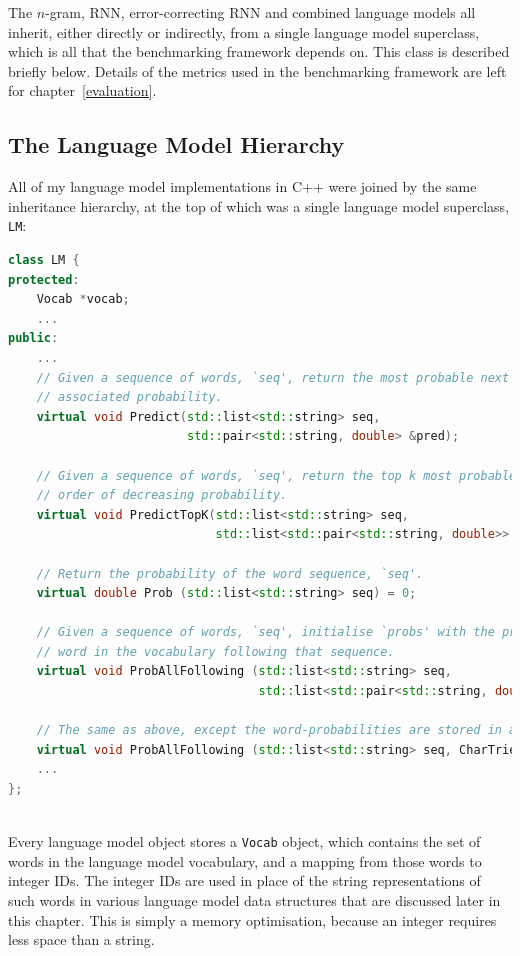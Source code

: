 \documentclass[a4paper, 12pt]{report}
\newcommand{\ttt}[1]{\texttt{#1}}
\begin{document}
The $n$-gram, RNN, error-correcting RNN and combined language models all inherit, either directly or indirectly, from a single language model superclass, which is all that the benchmarking framework depends on. This class is described briefly below. Details of the metrics used in the benchmarking framework are left for chapter~\ref{evaluation}. \\

\subsection{The Language Model Hierarchy} \label{lm_interface}

All of my language model implementations in C++ were joined by the same inheritance hierarchy, at the top of which was a single language model superclass, \ttt{LM}: \\

\begin{lstlisting}[language=C++]
class LM {
protected:
    Vocab *vocab;
    ...
public:
    ...
    // Given a sequence of words, `seq', return the most probable next word, with its
    // associated probability.
    virtual void Predict(std::list<std::string> seq,
                         std::pair<std::string, double> &pred);
    
    // Given a sequence of words, `seq', return the top k most probable next words, in
    // order of decreasing probability.
    virtual void PredictTopK(std::list<std::string> seq,
                             std::list<std::pair<std::string, double>> &preds, int k);
    
    // Return the probability of the word sequence, `seq'.
    virtual double Prob (std::list<std::string> seq) = 0;
    
    // Given a sequence of words, `seq', initialise `probs' with the probability of each
    // word in the vocabulary following that sequence.
    virtual void ProbAllFollowing (std::list<std::string> seq,
                                   std::list<std::pair<std::string, double>> &probs) = 0;
    
    // The same as above, except the word-probabilities are stored in a character trie.
    virtual void ProbAllFollowing (std::list<std::string> seq, CharTrie *probs) = 0;
    ...
};
\end{lstlisting}
~\\

Every language model object stores a \ttt{Vocab} object, which contains the set of words in the language model vocabulary, and a mapping from those words to integer IDs. The integer IDs are used in place of the string representations of such words in various language model data structures that are discussed later in this chapter. This is simply a memory optimisation, because an integer requires less space than a string. \\
\end{document}
